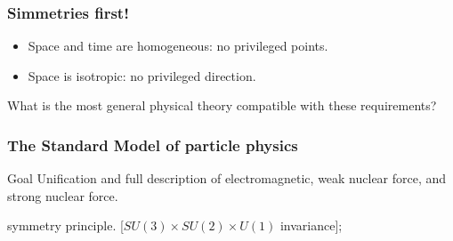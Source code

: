 \documentclass[ukenglish]{beamer}
\begin{document}
\begin{frame}
    \frametitle{Simmetries first!}
    \begin{itemize}
        \item Space and time are homogeneous: no privileged points.
        \item Space is isotropic: no privileged direction.
    \end{itemize}

    What is the most general physical theory compatible with these requirements?

\end{frame}

\begin{frame}
    \frametitle{The Standard Model of particle physics}
    \begin{block}
        {Goal}
    Unification and full description of electromagnetic, weak nuclear force, and strong nuclear
    force.
    \end{block}
    \begin{enumerate}
         {\item symmetry principle. [$SU(3) \times SU(2) \times
            U(1)$ invariance]; }
    \end{enumerate}

    \begin{figure}[h!]
        \centering
    \end{figure}
\end{frame}
\end{document}
